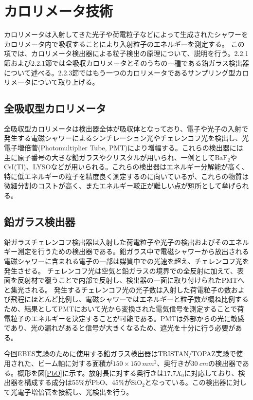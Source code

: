 \section{カロリメータ技術}
カロリメータは入射してきた光子や荷電粒子などによって生成されたシャワーをカロリメータ内で吸収することにより入射粒子のエネルギーを測定する。
この項では、カロリメータ検出器による粒子検出の原理について、説明を行う。2.2.1節および2.2.1節では全吸収カロリメータとそのうちの一種である鉛ガラス検出器について述べる。2.2.3節ではもう一つのカロリメータであるサンプリング型カロリメータについて取り上げる。

\subsection{全吸収型カロリメータ}
全吸収型カロリメータは検出器全体が吸収体となっており、電子や光子の入射で発生する電磁シャワーによるシンチレーション光やチェレンコフ光\cite{PDG_Cal}を検出し、光電子増倍菅(Photomultiplier Tube, PMT)により増幅する。これらの検出器には主に原子番号の大きな鉛ガラスやクリスタルが用いられ、一例として$\textrm{BaF}_2$やCsI(Tl)、LYSOなどが用いられる。これらの検出器はエネルギー分解能が高く、特に低エネルギーの粒子を精度良く測定するのに向いているが、これらの物質は微細分割のコストが高く、またエネルギー較正が難しい点が短所として挙げられる。

\subsection{鉛ガラス検出器}
鉛ガラスチェレンコフ検出器は入射した荷電粒子や光子の検出およびそのエネルギー測定を行うための検出器である。鉛ガラス中で電磁シャワーから放出される電磁シャワーに含まれる電子の一部は媒質中での光速を超え、チェレンコフ光を発生させる。%
チェレンコフ光は空気と鉛ガラスの境界での全反射に加えて、表面を反射材で覆うことで内部で反射し、検出器の一面に取り付けられたPMTへと集光される。
発生するチェレンコフ光の光子数は入射した荷電粒子の数および飛程にほとんど比例し、電磁シャワーではエネルギーと粒子数が概ね比例するため、結果としてPMTにおいて光から変換された電気信号を測定することで荷電粒子のエネルギーを決定することが可能である。PMTは外部からの光に敏感であり、光の漏れがあると信号が大きくなるため、遮光を十分に行う必要がある。

今回EBES実験のために使用する鉛ガラス検出器はTRISTAN/TOPAZ実験で使用された、ビーム軸に対する面積が$150\times\SI{150}{mm^2}$、奥行きが$\SI{30}{cm}$の検出器である\cite{LeadGlass}。概形を図\ref{PbO}に示す。放射長に対する奥行きは$17.7X_0$に対応しており、検出器を構成する成分は55\%がPbO、45\%が$\textrm{SiO}_2$となっている。この検出器に対して光電子増倍菅を接続し、光検出を行う。

